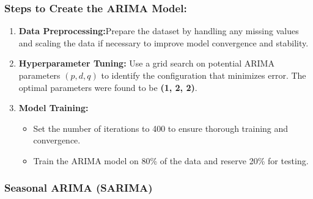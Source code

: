 \subsubsection{Steps to Create the ARIMA Model:}
\begin{enumerate}
	\item \textbf{Data Preprocessing:}Prepare the dataset by handling any missing values and scaling the data if necessary to improve model convergence and stability.

\item \textbf{Hyperparameter Tuning:}  
Use a grid search on potential ARIMA parameters $(p, d, q)$ to identify the configuration that minimizes error. The optimal parameters were found to be \textbf{(1, 2, 2)}.

\item \textbf{Model Training:}
\begin{itemize}
	\item Set the number of iterations to 400 to ensure thorough training and convergence.
	\item Train the ARIMA model on 80\% of the data and reserve 20\% for testing.
\end{itemize}
\end{enumerate}


\subsubsection{Seasonal ARIMA (SARIMA)}

